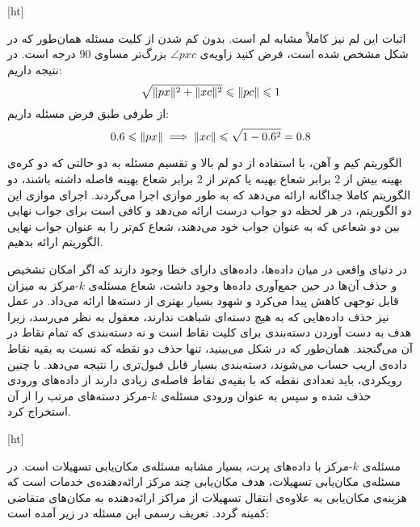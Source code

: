 
[ht]


اثبات این لم نیز کاملاً مشابه لم  است.
بدون کم شدن از کلیت مسئله همان‌طور که در شکل  مشخص شده است، فرض کنید زاویه‌ی $\angle{pxc}$ بزرگ‌تر مساوی $90$ درجه است.
در نتیجه داریم:
$$\sqrt{\|{px}\|^2 + \|{xc}\|^2} \leqslant \|{pc}\| \leqslant 1$$
از طرفی طبق فرض مسئله داریم:
$$0.6 \leqslant \|{px}\| \implies \|{xc}\| \leqslant \sqrt{1 - 0.6^2} = 0.8$$


الگوریتم کیم و آهن، با استفاده از دو لم بالا و تقسیم مسئله به دو حالتی که دو کره‌ی بهینه بیش از $2$ برابر شعاع بهینه یا کم‌تر از $2$ برابر شعاع بهینه فاصله داشته باشند، دو الگوریتم کاملا جداگانه ارائه می‌دهد که به طور موازی اجرا می‌گردند.
اجرای موازی این دو الگوریتم، در هر لحظه دو جواب درست ارائه می‌دهد و کافی است برای جواب نهایی بین دو شعاعی که به عنوان جواب خود می‌دهند، شعاع کم‌تر را به عنوان جواب نهایی الگوریتم ارائه بدهیم.


در دنیای واقعی در میان داده‌ها، داده‌های دارای خطا وجود دارند که اگر امکان تشخیص و حذف آن‌ها در حین جمع‌آوری داده‌ها وجود داشت، شعاع مسئله‌ی $k$-مرکز به میزان قابل توجهی کاهش پیدا می‌کرد و شهود بسیار بهتری از دسته‌ها ارائه می‌داد.
در عمل نیز حذف داده‌هایی که به هیچ دسته‌ای شباهت ندارند، معقول به نظر می‌رسد، زیرا هدف به دست آوردن دسته‌بندی برای کلیت نقاط است و نه دسته‌بندی که تمام نقاط در آن می‌گنجند.
همان‌طور که در شکل  می‌بینید، تنها حذف دو نقطه که نسبت به بقیه نقاط داده‌ی اریب حساب می‌شوند، دسته‌بندی بسیار قابل قبول‌تری  را نتیجه می‌دهد.
با چنین رویکردی، باید تعدادی نقطه که با بقیه‌ی نقاط فاصله‌ی زیادی دارند از داده‌های ورودی حذف شده و سپس به عنوان ورودی مسئله‌ی $k$-مرکز دسته‌های مرتب را از آن استخراج کرد. 

[ht]

مسئله‌ی $k$-مرکز با داده‌های پرت، بسیار مشابه مسئله‌ی مکان‌یابی تسهیلات است.
در مسئله‌ی مکان‌یابی تسهیلات، هدف مکان‌یابی چند مرکز ارائه‌دهنده‌ی خدمات است که هزینه‌ی مکان‌یابی به علاوه‌ی انتقال تسهیلات از مراکز ارائه‌دهنده به مکان‌های متقاضی کمینه گردد.
تعریف رسمی این مسئله در زیر آمده است:

